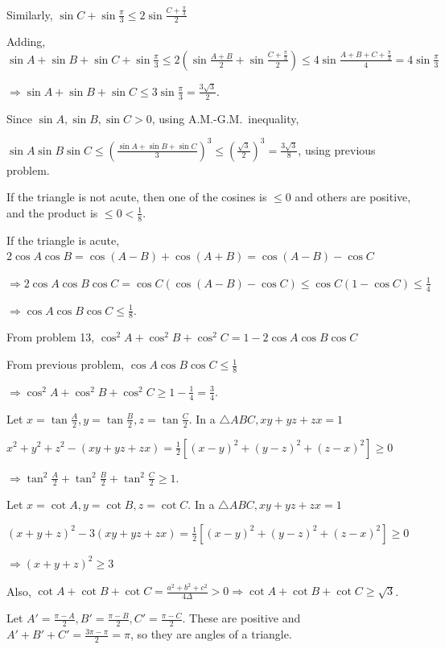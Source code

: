   Similarly, $\sin C + \sin\frac{\pi}{3}\leq 2\sin\frac{C + \frac{\pi}{3}}{2}$

  Adding, $\sin A + \sin B + \sin C + \sin\frac{\pi}{3}\leq 2\left(\sin\frac{A + B}{2} + \sin\frac{C +
  \frac{\pi}{3}}{2}\right)\leq 4\sin\frac{A + B + C + \frac{\pi}{3}}{4} = 4\sin\frac{\pi}{3}$

  $\Rightarrow \sin A + \sin B + \sin C\leq 3\sin\frac{\pi}{3} = \frac{3\sqrt{3}}{2}$.
\item Since $\sin A, \sin B, \sin C > 0$, using A.M.-G.M.\ inequality,

  $\sin A\sin B\sin C\leq \left(\frac{\sin A + \sin B + \sin C}{3}\right)^3\leq
  \left(\frac{\sqrt{3}}{2}\right)^3 = \frac{3\sqrt{3}}{8}$, using previous problem.
\item If the triangle is not acute, then one of the cosines is $\leq 0$ and others are positive, and the
  product is $\leq 0 < \frac{1}{8}$.

  If the triangle is acute, $2\cos A\cos B = \cos(A - B) + \cos(A + B) = \cos(A - B) - \cos C$

  $\Rightarrow 2\cos A\cos B\cos C = \cos C(\cos(A - B) - \cos C)\leq \cos C(1 - \cos C)\leq \frac{1}{4}$

  $\Rightarrow \cos A\cos B\cos C\leq \frac{1}{8}$.
\item From problem 13, $\cos^2A + \cos^2B + \cos^2C = 1 - 2\cos A\cos B\cos C$

  From previous problem, $\cos A\cos B\cos C\leq \frac{1}{8}$

  $\Rightarrow \cos^2A + \cos^2B + \cos^2C\geq 1 - \frac{1}{4} = \frac{3}{4}$.
\item Let $x = \tan\frac{A}{2}, y = \tan\frac{B}{2}, z = \tan\frac{C}{2}$. In a $\triangle ABC, xy + yz + zx =
  1$

  $x^2 + y^2 + z^2 - (xy + yz + zx) = \frac{1}{2}\left[(x - y)^2 + (y - z)^2 + (z - x)^2\right]\geq 0$

  $\Rightarrow \tan^2\frac{A}{2} + \tan^2\frac{B}{2} + \tan^2\frac{C}{2}\geq 1$.
\item Let $x = \cot A, y = \cot B, z = \cot C$. In a $\triangle ABC, xy + yz + zx = 1$

  $(x + y + z)^2 - 3(xy + yz + zx) = \frac{1}{2}\left[(x - y)^2 + (y - z)^2 + (z - x)^2\right]\geq 0$

  $\Rightarrow (x + y + z)^2\geq 3$

  Also, $\cot A + \cot B + \cot C = \frac{a^2 + b^2 + c^2}{4\Delta} > 0\Rightarrow \cot A + \cot B + \cot
  C\geq \sqrt{3}$.
\item Let $A' = \frac{\pi - A}{2}, B' = \frac{\pi - B}{2}, C' = \frac{\pi - C}{2}$. These are positive and
  $A' + B' + C' = \frac{3\pi - \pi}{2} = \pi$, so they are angles of a triangle.

